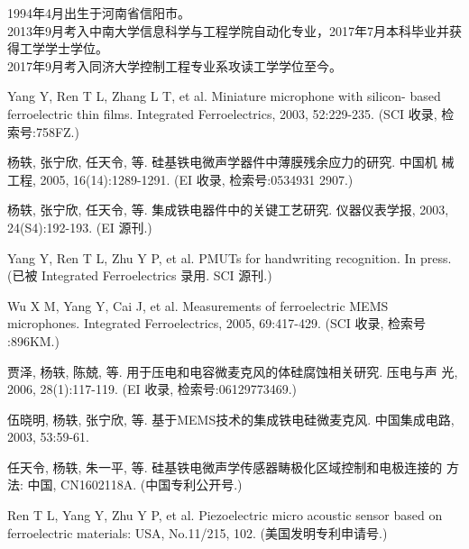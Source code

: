 \noindent 1994年4月出生于河南省信阳市。\\
\noindent 2013年9月考入中南大学信息科学与工程学院自动化专业，2017年7月本科毕业并获得工学学士学位。\\
\noindent 2017年9月考入同济大学控制工程专业系攻读工学学位至今。

\begin{enumerate}[{[}1{]}]
\item Yang Y, Ren T L, Zhang L T, et al. Miniature microphone with silicon-
  based ferroelectric thin films. Integrated Ferroelectrics, 2003,
  52:229-235. (SCI 收录, 检索号:758FZ.)
\item 杨轶, 张宁欣, 任天令, 等. 硅基铁电微声学器件中薄膜残余应力的研究. 中国机
  械工程, 2005, 16(14):1289-1291. (EI 收录, 检索号:0534931 2907.)
\item 杨轶, 张宁欣, 任天令, 等. 集成铁电器件中的关键工艺研究. 仪器仪表学报,
  2003, 24(S4):192-193. (EI 源刊.)
\item Yang Y, Ren T L, Zhu Y P, et al. PMUTs for handwriting recognition. In
  press. (已被 Integrated Ferroelectrics 录用. SCI 源刊.)
\item Wu X M, Yang Y, Cai J, et al. Measurements of ferroelectric MEMS
  microphones. Integrated Ferroelectrics, 2005, 69:417-429. (SCI 收录, 检索号
  :896KM.)
\item 贾泽, 杨轶, 陈兢, 等. 用于压电和电容微麦克风的体硅腐蚀相关研究. 压电与声
  光, 2006, 28(1):117-119. (EI 收录, 检索号:06129773469.)
\item 伍晓明, 杨轶, 张宁欣, 等. 基于MEMS技术的集成铁电硅微麦克风. 中国集成电路, 
  2003, 53:59-61.
\end{enumerate}

\begin{enumerate}[{[}1{]}]
\item 任天令, 杨轶, 朱一平, 等. 硅基铁电微声学传感器畴极化区域控制和电极连接的
  方法: 中国, CN1602118A. (中国专利公开号.)
\item Ren T L, Yang Y, Zhu Y P, et al. Piezoelectric micro acoustic sensor
  based on ferroelectric materials: USA, No.11/215, 102. (美国发明专利申请号.)
\end{enumerate}
